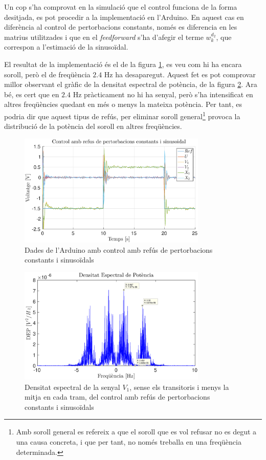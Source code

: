 \documentclass[12pt,a4paper,final,twoside,openright]{report}
\begin{document}
Un cop s'ha comprovat en la simulació que el control funciona de la forma desitjada, es pot procedir a la implementació en l'Arduino. En aquest cas en diferència al control de pertorbacions constants, només es diferencia en les matrius utilitzades i que en el \textit{feedforward} s'ha d'afegir el terme $w_k^{d_2}$, que correspon a l'estimació de la sinusoïdal. 

\vspace{16pt}
El resultat de la implementació és el de la figura \ref{fig:pert_sin_ct_pols_imag}, es veu com hi ha encara soroll, però el de freqüència $2.4$ Hz ha desaparegut. Aquest fet es pot comprovar millor observant el gràfic de la densitat espectral de potència, de la figura \ref{fig:power_spectral_nomean_pert_sin_pols_imag}. Ara bé, es cert que en $2.4$ Hz pràcticament no hi ha senyal, però s'ha intensificat en altres freqüències quedant en més o menys la mateixa potència. Per tant, es podria dir que aquest tipus de refús, per eliminar soroll general\footnote{Amb soroll general es refereix a que el soroll que es vol refusar no es degut a una causa concreta, i que per tant, no només treballa en una freqüència determinada.} provoca la distribució de la potència del soroll en altres freqüències.

\begin{figure}[h]
\centering
\includegraphics[width=0.8\textwidth]{Imatges/pert_sin_ct_pols_imag.eps}
\caption{Dades de l'Arduino amb control amb refús de pertorbacions constants i sinusoïdals\label{fig:pert_sin_ct_pols_imag}}
\end{figure}

\begin{figure}[h]
\centering
\includegraphics[width=0.8\textwidth]{Imatges/power_spectral_nomean_pert_sin_pols_imag.eps}
\caption{Densitat espectral de la senyal $V_1$, sense els transitoris i menys la mitja en cada tram, del control amb refús de pertorbacions constants i sinusoïdals\label{fig:power_spectral_nomean_pert_sin_pols_imag}}
\end{figure}
\end{document}
